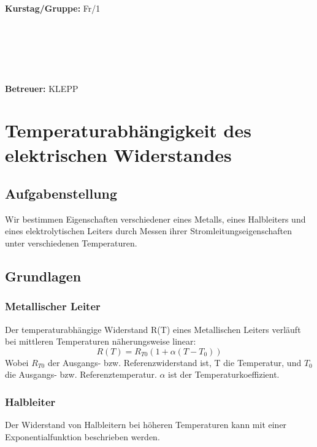 \documentclass{article}
\begin{document}
\begin{verbatim}


\end{verbatim}
			\begin{flushleft}
			\textbf{\Large{Kurstag/Gruppe:}} \Large{Fr/1}
			\end{flushleft}

\begin{verbatim}






\end{verbatim}
			\begin{flushleft}
			\LARGE{\textbf{Betreuer:}}	\Large{KLEPP}	
			\end{flushleft}
\newpage	

\section{Temperaturabhängigkeit des elektrischen Widerstandes}

\subsection{Aufgabenstellung}
Wir bestimmen Eigenschaften verschiedener eines Metalls, eines Halbleiters und eines elektrolytischen Leiters durch Messen ihrer Stromleitungseigenschaften unter verschiedenen Temperaturen.
\subsection{Grundlagen}
\subsubsection*{Metallischer Leiter}
Der temperaturabhängige Widerstand R(T) eines Metallischen Leiters verläuft bei mittleren Temperaturen näherungsweise linear:
\begin{equation}
\label{MetallWiderstand}
R(T) = R_{T0} (1+ \alpha (T-T_0))
\end{equation}
Wobei $ R_{T0}$ der Ausgangs- bzw. Referenzwiderstand ist,
T die Temperatur, und 
$T_0$ die Ausgangs- bzw. Referenztemperatur. 
$\alpha$ ist der Temperaturkoeffizient.\\

\subsubsection*{Halbleiter}
Der Widerstand von Halbleitern bei höheren Temperaturen kann mit einer Exponentialfunktion beschrieben werden.
\end{document}
